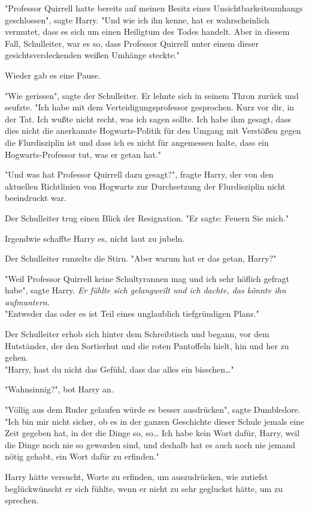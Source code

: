 {"Professor Quirrell hatte bereits auf meinen Besitz eines Unsichtbarkeitsumhangs geschlossen", sagte Harry. "Und wie ich ihn kenne, hat er wahrscheinlich vermutet, dass es sich um einen Heiligtum des Todes handelt. Aber in diesem Fall, Schulleiter, war es so, dass Professor Quirrell unter einem dieser gesichtsverdeckenden weißen Umhänge steckte."

Wieder gab es eine Pause.

"Wie gerissen", sagte der Schulleiter. Er lehnte sich in seinem Thron zurück und seufzte. "Ich habe mit dem Verteidigungsprofessor gesprochen. Kurz vor dir, in der Tat. Ich wußte nicht recht, was ich sagen sollte. Ich habe ihm gesagt, dass dies nicht die anerkannte Hogwarts-Politik für den Umgang mit Verstößen gegen die Flurdisziplin ist und dass ich es nicht für angemessen halte, dass ein Hogwarts-Professor tut, was er getan hat."

"Und was hat Professor Quirrell dazu gesagt?", fragte Harry, der von den aktuellen Richtlinien von Hogwarts zur Durchsetzung der Flurdisziplin nicht beeindruckt war.

Der Schulleiter trug einen Blick der Resignation. "Er sagte: Feuern Sie mich."

Irgendwie schaffte Harry es, nicht laut zu jubeln.

Der Schulleiter runzelte die Stirn. "Aber warum hat er das getan, Harry?"

"Weil Professor Quirrell keine Schultyrannen mag und ich sehr höflich gefragt habe", sagte Harry. \emph{Er fühlte sich gelangweilt und ich dachte, das könnte ihn aufmuntern.}\\ "Entweder das oder es ist Teil eines unglaublich tiefgründigen Plans."

Der Schulleiter erhob sich hinter dem Schreibtisch und begann, vor dem Hutständer, der den Sortierhut und die roten Pantoffeln hielt, hin und her zu gehen.\\ "Harry, hast du nicht das Gefühl, dass das alles ein bisschen…"

"Wahnsinnig?", bot Harry an.

"Völlig aus dem Ruder gelaufen würde es besser ausdrücken", sagte Dumbledore. "Ich bin mir nicht sicher, ob es in der ganzen Geschichte dieser Schule jemals eine Zeit gegeben hat, in der die Dinge so, so… Ich habe kein Wort dafür, Harry, weil die Dinge noch nie so geworden sind, und deshalb hat es auch noch nie jemand nötig gehabt, ein Wort dafür zu erfinden."

Harry hätte versucht, Worte zu erfinden, um auszudrücken, wie zutiefst beglückwünscht er sich fühlte, wenn er nicht zu sehr gegluckst hätte, um zu sprechen.

}
